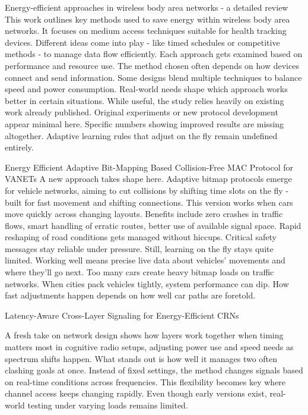\documentclass[a4paper,fleqn]{cas-dc}
\numberwithin{equation}{section}
\begin{document}
Energy-efficient approaches in wireless body area networks - a detailed review
This work outlines key methods used to save energy within wireless body area networks. It focuses on medium access techniques suitable for health tracking devices. Different ideas come into play - like timed schedules or competitive methods - to manage data flow efficiently. Each approach gets examined based on performance and resource use. The method chosen often depends on how devices connect and send information. Some designs blend multiple techniques to balance speed and power consumption. Real-world needs shape which approach works better in certain situations. While useful, the study relies heavily on existing work already published. Original experiments or new protocol development appear minimal here. Specific numbers showing improved results are missing altogether. Adaptive learning rules that adjust on the fly remain undefined entirely\cite{Boumaiz2025}.


Energy Efficient Adaptive Bit-Mapping Based Collision-Free MAC Protocol for VANETs
A new approach takes shape here. Adaptive bitmap protocols emerge for vehicle networks, aiming to cut collisions by shifting time slots on the fly - built for fast movement and shifting connections. This version works when cars move quickly across changing layouts. Benefits include zero crashes in traffic flows, smart handling of erratic routes, better use of available signal space. Rapid reshaping of road conditions gets managed without hiccups. Critical safety messages stay reliable under pressure. Still, learning on the fly stays quite limited. Working well means precise live data about vehicles’ movements and where they’ll go next. Too many cars create heavy bitmap loads on traffic networks. When cities pack vehicles tightly, system performance can dip. How fast adjustments happen depends on how well car paths are foretold.\cite{Tolani2025}





Latency-Aware Cross-Layer Signaling for Energy-Efficient CRNs

A fresh take on network design shows how layers work together when timing matters most in cognitive radio setups, adjusting power use and speed needs as spectrum shifts happen. What stands out is how well it manages two often clashing goals at once. Instead of fixed settings, the method changes signals based on real-time conditions across frequencies. This flexibility becomes key where channel access keeps changing rapidly. Even though early versions exist, real-world testing under varying loads remains limited.
\end{document}
